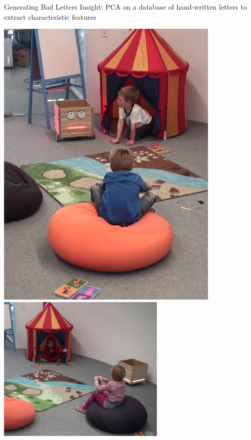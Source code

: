 \documentclass[compress]{beamer}
\begin{document}

\begin{frame}{Generating Bad Letters}
    \centering
     {
    Insight: PCA on a database of hand-written letters to extract characteristic features
    }

     {
    \includegraphics[width=0.8\textwidth]{domino-disobey}
    }
     {
    \includegraphics[width=0.6\textwidth]{domino-lost}
    }
\end{frame}
\end{document}
